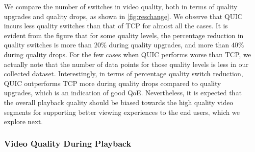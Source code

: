 We compare the number of switches in video quality, both in terms of quality upgrades and quality drops, as shown in \fig\ref{fig:reschange}.
We observe that QUIC incurs less quality switches than that of TCP for almost all the cases. 
It is evident from the figure that for some quality levels, the percentage reduction in quality switches is more than $20\%$ during quality upgrades, and more than $40\%$ during quality drops. For the few cases when QUIC performs worse than TCP, we actually note that the number of data points for those quality levels is less in our collected dataset. Interestingly, in terms of percentage quality switch reduction, QUIC outperforms TCP  more during quality drops compared to quality upgrades, which is an indication of good QoE.  Nevertheless, it is expected that the overall playback quality should be biased towards the high quality video segments for supporting better viewing experiences to the end users, which we explore next. 

\subsubsection{Video Quality During Playback}

